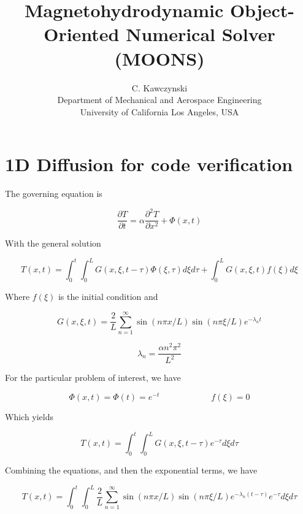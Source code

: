 \documentclass[11pt]{article}
\begin{document}
\doublespacing
\title{Magnetohydrodynamic Object-Oriented Numerical Solver (MOONS)}
\author{C. Kawczynski \\
Department of Mechanical and Aerospace Engineering \\
University of California Los Angeles, USA\\
}
\maketitle

\section{1D Diffusion for code verification}
The governing equation is

\begin{equation}
	\frac{\partial T}{\partial t} = \alpha \frac{\partial^2 T}{\partial x^2} + \Phi(x,t)
\end{equation}

With the general solution

\begin{equation}
	T(x,t) = \int_0^t \int_0^L G(x,\xi,t-\tau) \Phi(\xi,\tau) d\xi d\tau
	+
	\int_0^L G(x,\xi,t) f(\xi) d\xi
\end{equation}

Where $f(\xi)$ is the initial condition and 

\begin{equation}
	G(x,\xi,t) = \frac{2}{L} \sum_{n=1}^{\infty}
	\sin(n\pi x/L)
	\sin(n\pi \xi/L)
	e^{-\lambda_n t}
\end{equation}

\begin{equation}
	\lambda_n = \frac{\alpha n^2\pi^2}{L^2}
\end{equation}

For the particular problem of interest, we have

\begin{equation}
	\Phi(x,t) = \Phi(t) = e^{-t} \qquad \qquad \qquad f(\xi) = 0
\end{equation}

Which yields

\begin{equation}
	T(x,t) = \int_0^t \int_0^L G(x,\xi,t-\tau) e^{-\tau} d\xi d\tau
\end{equation}

Combining the equations, and then the exponential terms, we have

\begin{equation}
	T(x,t) = \int_0^t \int_0^L 
	\frac{2}{L} \sum_{n=1}^{\infty}
	\sin(n\pi x/L)
	\sin(n\pi \xi/L)
	e^{-\lambda_n (t-\tau)}
	e^{-\tau}
	d\xi d\tau
\end{equation}
\end{document}
